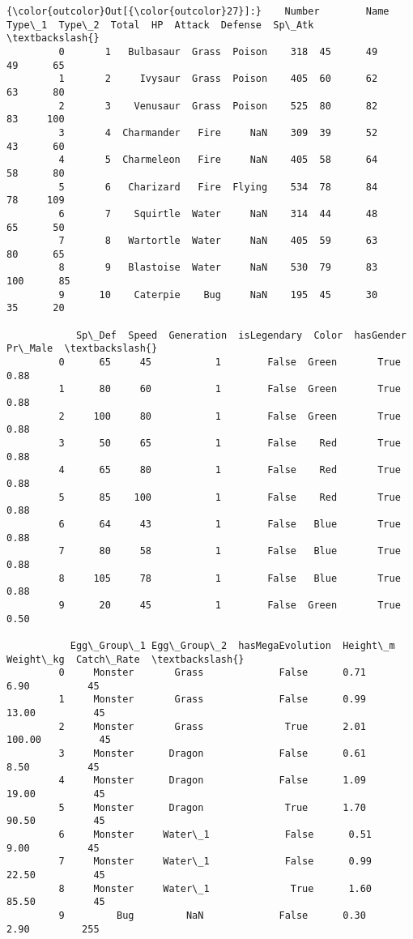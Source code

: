 \documentclass[11pt]{article}
\begin{document}
\begin{Verbatim}[commandchars=\\\{\}]
{\color{outcolor}Out[{\color{outcolor}27}]:}    Number        Name Type\_1  Type\_2  Total  HP  Attack  Defense  Sp\_Atk  \textbackslash{}
         0       1   Bulbasaur  Grass  Poison    318  45      49       49      65   
         1       2     Ivysaur  Grass  Poison    405  60      62       63      80   
         2       3    Venusaur  Grass  Poison    525  80      82       83     100   
         3       4  Charmander   Fire     NaN    309  39      52       43      60   
         4       5  Charmeleon   Fire     NaN    405  58      64       58      80   
         5       6   Charizard   Fire  Flying    534  78      84       78     109   
         6       7    Squirtle  Water     NaN    314  44      48       65      50   
         7       8   Wartortle  Water     NaN    405  59      63       80      65   
         8       9   Blastoise  Water     NaN    530  79      83      100      85   
         9      10    Caterpie    Bug     NaN    195  45      30       35      20   
         
            Sp\_Def  Speed  Generation  isLegendary  Color  hasGender  Pr\_Male  \textbackslash{}
         0      65     45           1        False  Green       True     0.88   
         1      80     60           1        False  Green       True     0.88   
         2     100     80           1        False  Green       True     0.88   
         3      50     65           1        False    Red       True     0.88   
         4      65     80           1        False    Red       True     0.88   
         5      85    100           1        False    Red       True     0.88   
         6      64     43           1        False   Blue       True     0.88   
         7      80     58           1        False   Blue       True     0.88   
         8     105     78           1        False   Blue       True     0.88   
         9      20     45           1        False  Green       True     0.50   
         
           Egg\_Group\_1 Egg\_Group\_2  hasMegaEvolution  Height\_m  Weight\_kg  Catch\_Rate  \textbackslash{}
         0     Monster       Grass             False      0.71       6.90          45   
         1     Monster       Grass             False      0.99      13.00          45   
         2     Monster       Grass              True      2.01     100.00          45   
         3     Monster      Dragon             False      0.61       8.50          45   
         4     Monster      Dragon             False      1.09      19.00          45   
         5     Monster      Dragon              True      1.70      90.50          45   
         6     Monster     Water\_1             False      0.51       9.00          45   
         7     Monster     Water\_1             False      0.99      22.50          45   
         8     Monster     Water\_1              True      1.60      85.50          45   
         9         Bug         NaN             False      0.30       2.90         255   
         

\end{Verbatim}
\end{document}
